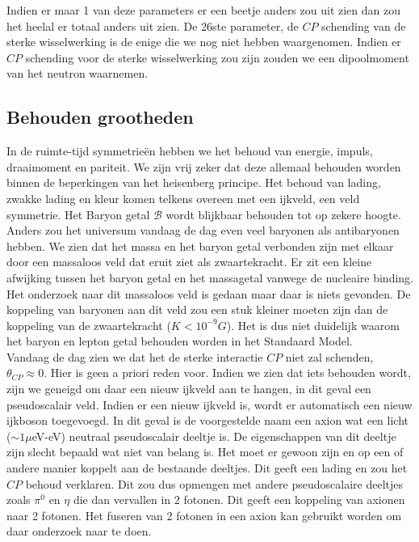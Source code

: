 \documentclass[../main.tex]{subfiles}
\begin{document}
Indien er maar 1 van deze parameters er een beetje anders zou uit zien dan zou het heelal er totaal anders uit zien. De 26ste parameter, de $CP$ schending van de sterke wisselwerking is de enige die we nog niet hebben waargenomen. Indien er $CP$ schending voor de sterke wisselwerking zou zijn zouden we een dipoolmoment van het neutron waarnemen.

\subsection{Behouden grootheden}%
\label{sub:behouden_grootheden}

In de ruimte-tijd symmetrieën hebben we het behoud van energie, impuls, draaimoment en pariteit. We zijn vrij zeker dat deze allemaal behouden worden binnen de beperkingen van het heisenberg principe. Het behoud van lading, zwakke lading en kleur komen telkens overeen met een ijkveld, een veld symmetrie. Het Baryon getal $\mathcal{B}$ wordt blijkbaar behouden tot op zekere hoogte. Anders zou het universum vandaag de dag even veel baryonen als antibaryonen hebben. We zien dat het massa en het baryon getal verbonden zijn met elkaar door een massaloos veld dat eruit ziet als zwaartekracht. Er zit een kleine afwijking tussen het baryon getal en het massagetal vanwege de nucleaire binding. Het onderzoek naar dit massaloos veld is gedaan maar daar is niets gevonden. De koppeling van baryonen aan dit veld zou een stuk kleiner moeten zijn dan de koppeling van de zwaartekracht ($K<10^{-9}G$). Het is dus niet duidelijk waarom het baryon en lepton getal behouden worden in het Standaard Model.\\
Vandaag de dag zien we dat het de sterke interactie $CP$ niet zal schenden, $\theta_{C P} \approx 0$. Hier is geen a priori reden voor. Indien we zien dat iets behouden wordt, zijn we geneigd om daar een nieuw ijkveld aan te hangen, in dit geval een pseudoscalair veld. Indien er een nieuw ijkveld is, wordt er automatisch een nieuw ijkboson toegevoegd. In dit geval is de voorgestelde naam een axion wat een licht ($\sim 1\mu$eV-eV) neutraal pseudoscalair deeltje is. De eigenschappen van dit deeltje zijn slecht bepaald wat niet van belang is. Het moet er gewoon zijn en op een of andere manier koppelt aan de bestaande deeltjes. Dit geeft een lading en zou het $CP$ behoud verklaren. Dit zou dus opmengen met andere pseudoscalaire deeltjes zoals $\pi^0$ en $\eta$ die dan vervallen in 2 fotonen. Dit geeft een koppeling van axionen naar 2 fotonen. Het fuseren van 2 fotonen in een axion kan gebruikt worden om daar onderzoek naar te doen.
\end{document}
